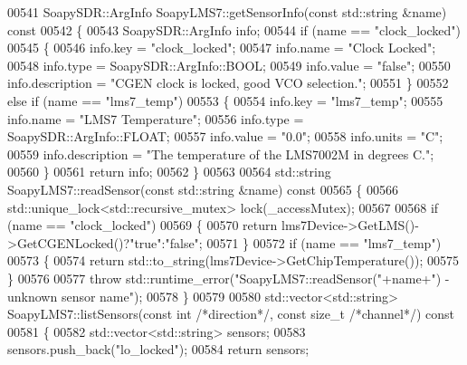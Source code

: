 \begin{DoxyCode}
{{{{{{{{{{{{{{00541 SoapySDR::ArgInfo SoapyLMS7::getSensorInfo(\textcolor{keyword}{const} std::string &name)\textcolor{keyword}{ const}
00542 \textcolor{keyword}{}\{
00543     SoapySDR::ArgInfo info;
00544     \textcolor{keywordflow}{if} (name == \textcolor{stringliteral}{"clock\_locked"})
00545     \{
00546         info.key = \textcolor{stringliteral}{"clock\_locked"};
00547         info.name = \textcolor{stringliteral}{"Clock Locked"};
00548         info.type = SoapySDR::ArgInfo::BOOL;
00549         info.value = \textcolor{stringliteral}{"false"};
00550         info.description = \textcolor{stringliteral}{"CGEN clock is locked, good VCO selection."};
00551     \}
00552     \textcolor{keywordflow}{else} \textcolor{keywordflow}{if} (name == \textcolor{stringliteral}{"lms7\_temp"})
00553     \{
00554         info.key = \textcolor{stringliteral}{"lms7\_temp"};
00555         info.name = \textcolor{stringliteral}{"LMS7 Temperature"};
00556         info.type = SoapySDR::ArgInfo::FLOAT;
00557         info.value = \textcolor{stringliteral}{"0.0"};
00558         info.units = \textcolor{stringliteral}{"C"};
00559         info.description = \textcolor{stringliteral}{"The temperature of the LMS7002M in degrees C."};
00560     \}
00561     \textcolor{keywordflow}{return} info;
00562 \}
00563 
00564 std::string SoapyLMS7::readSensor(\textcolor{keyword}{const} std::string &name)\textcolor{keyword}{ const}
00565 \textcolor{keyword}{}\{
00566     std::unique\_lock<std::recursive\_mutex> lock(_accessMutex);
00567 
00568     \textcolor{keywordflow}{if} (name == \textcolor{stringliteral}{"clock\_locked"})
00569     \{
00570         \textcolor{keywordflow}{return} lms7Device->GetLMS()->GetCGENLocked()?\textcolor{stringliteral}{"true"}:\textcolor{stringliteral}{"false"};
00571     \}
00572     \textcolor{keywordflow}{if} (name == \textcolor{stringliteral}{"lms7\_temp"})
00573     \{
00574         \textcolor{keywordflow}{return} std::to\_string(lms7Device->GetChipTemperature());
00575     \}
00576 
00577     \textcolor{keywordflow}{throw} std::runtime\_error(\textcolor{stringliteral}{"SoapyLMS7::readSensor("}+name+\textcolor{stringliteral}{") - unknown sensor name"});
00578 \}
00579 
00580 std::vector<std::string> SoapyLMS7::listSensors(\textcolor{keyword}{const} \textcolor{keywordtype}{int} \textcolor{comment}{/*direction*/}, \textcolor{keyword}{const} \textcolor{keywordtype}{size\_t} \textcolor{comment}{/*channel*/})\textcolor{keyword}{ const}
00581 \textcolor{keyword}{}\{
00582     std::vector<std::string> sensors;
00583     sensors.push\_back(\textcolor{stringliteral}{"lo\_locked"});
00584     \textcolor{keywordflow}{return} sensors;
}}}}}}}}}}}}}}
\end{DoxyCode}
